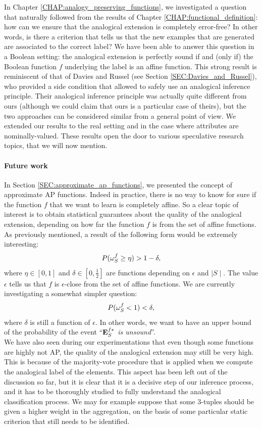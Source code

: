 In Chapter \ref{CHAP:analogy_preserving_functions}, we investigated a question
that naturally followed from the results of Chapter
\ref{CHAP:functional_definition}: how can we ensure that the analogical
extension is completely error-free? In other words, is there a criterion that
tells us that the new examples that are generated are associated to the correct
label? We have been able to answer this question in a Boolean setting: the
analogical extension is perfectly sound if and (only if) the Boolean function
$f$ underlying the label is an affine function. This strong result
\cite{CouHugPraRicIJCAI17} is reminiscent of that of Davies and Russel (see
Section \ref{SEC:Davies_and_Russel}), who provided a side condition that
allowed to safely use an analogical inference principle. Their analogical
inference principle was actually quite different from ours (although we could claim
that ours is a particular case of theirs), but the two approaches can be
considered similar from a general point of view. We extended our results to the
real setting and in the case where attributes are nominally-valued. These
results open the door to various speculative research topics, that we will now
mention.

\paragraph{Future work\\}

In Section \ref{SEC:approximate_ap_functions}, we presented the concept of
approximate AP functions. Indeed in practice, there is no way
to know for sure if the function $f$ that we want to learn is completely
affine. So a clear topic of interest is to obtain statistical guarantees about
the quality of the analogical extension, depending on how far the function $f$
is from the set of affine functions. As previously mentioned, a result of the
following form would be extremely interesting:
$$P(\omega_{S}^{f} \geq \eta) > 1 - \delta,$$
where $\eta \in [0, 1]$ and $\delta \in [0, \frac{1}{2}]$ are functions
depending on $\epsilon$ and $\mid S \mid$. The value $\epsilon$ tells us that
$f$ is $\epsilon$-close from the set of affine functions.  We are currently
investigating a somewhat simpler question:
$$P(\omega_{S}^{f} < 1) < \delta,$$
where $\delta$ is still a function of $\epsilon$. In other words, we want to
have an upper bound of the probability of the event ``\textit{$\mathbf{E}_{S}^{f*}$ is
unsound}''.\\

We have also seen during our experimentations that even though some functions are
highly not AP, the quality of the analogical extension may still be very high.
This is because of the majority-vote procedure that is applied when we compute
the analogical label of the elements. This aspect has been left out of the
discussion so far, but it is clear that it is a decisive step of our inference
process, and it has to be thoroughly studied to fully understand the analogical
classification process. We may for example suppose that some $3$-tuples should
be given a higher weight in the aggregation, on the basis of some particular
static criterion that still needs to be identified.\\

